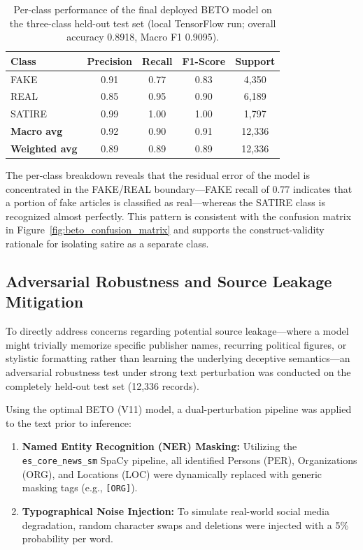 \documentclass[informatics,article,submit,pdftex,moreauthors]{Definitions/mdpi}
\begin{document}
\begin{table}[H]
\centering
\caption{Per-class performance of the final deployed BETO model on the three-class held-out test set (local TensorFlow run; overall accuracy 0.8918, Macro F1 0.9095).}
\label{tab:beto_per_class}
\begin{tabular}{lcccc}
\toprule
\textbf{Class} & \textbf{Precision} & \textbf{Recall} & \textbf{F1-Score} & \textbf{Support} \\
\midrule
FAKE   & 0.91 & 0.77 & 0.83 & 4{,}350 \\
REAL   & 0.85 & 0.95 & 0.90 & 6{,}189 \\
SATIRE & 0.99 & 1.00 & 1.00 & 1{,}797 \\
\midrule
\textbf{Macro avg}    & 0.92 & 0.90 & 0.91 & 12{,}336 \\
\textbf{Weighted avg} & 0.89 & 0.89 & 0.89 & 12{,}336 \\
\bottomrule
\end{tabular}
\end{table}

The per-class breakdown reveals that the residual error of the model is concentrated in the FAKE/REAL boundary—FAKE recall of 0.77 indicates that a portion of fake articles is classified as real—whereas the SATIRE class is recognized almost perfectly. This pattern is consistent with the confusion matrix in Figure~\ref{fig:beto_confusion_matrix} and supports the construct-validity rationale for isolating satire as a separate class.

\subsection{Adversarial Robustness and Source Leakage Mitigation}
To directly address concerns regarding potential source leakage—where a model might trivially memorize specific publisher names, recurring political figures, or stylistic formatting rather than learning the underlying deceptive semantics—an adversarial robustness test under strong text perturbation was conducted on the completely held-out test set (12,336 records).

Using the optimal BETO (V11) model, a dual-perturbation pipeline was applied to the text prior to inference:
\begin{enumerate}
    \item \textbf{Named Entity Recognition (NER) Masking:} Utilizing the \texttt{es\_core\_news\_sm} SpaCy pipeline, all identified Persons (PER), Organizations (ORG), and Locations (LOC) were dynamically replaced with generic masking tags (e.g., \texttt{[ORG]}).
    \item \textbf{Typographical Noise Injection:} To simulate real-world social media degradation, random character swaps and deletions were injected with a 5\% probability per word.
\end{enumerate}
\end{document}
